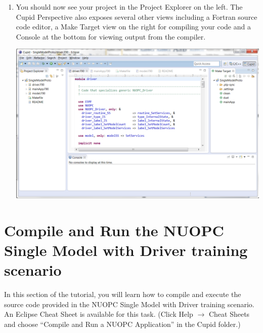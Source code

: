 \documentclass[oneside,11pt]{memoir}
\begin{document}
\begin{enumerate}
\item You should now see your project in the Project Explorer on the left.  The Cupid Perspective also exposes several other views including a Fortran source code editor, a Make Target view on the right for compiling your code and a Console at the bottom for viewing output from the compiler.

\parbox{\linewidth}{\centering
  \includegraphics[width=\textwidth]{figs/cloud_fig7.png}
}

\end{enumerate}



\section{Compile and Run the NUOPC Single Model with Driver training scenario}

In this section of the tutorial, you will learn how to compile and execute the source code provided in the NUOPC Single Model with Driver training scenario.   An Eclipse Cheat Sheet is available for this task.  (Click Help $\rightarrow$ Cheat Sheets and choose ``Compile and Run a NUOPC Application'' in the Cupid folder.)
\end{document}
